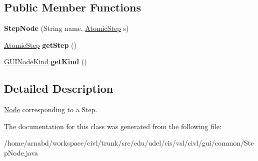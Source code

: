 \subsection*{Public Member Functions}
\begin{DoxyCompactItemize}
\item 
\hypertarget{classedu_1_1udel_1_1cis_1_1vsl_1_1civl_1_1gui_1_1common_1_1StepNode_a1a8b2ff13284c3a8cd0e5b65e8a2e622}{}{\bfseries Step\+Node} (String name, \hyperlink{interfaceedu_1_1udel_1_1cis_1_1vsl_1_1civl_1_1kripke_1_1IF_1_1AtomicStep}{Atomic\+Step} s)\label{classedu_1_1udel_1_1cis_1_1vsl_1_1civl_1_1gui_1_1common_1_1StepNode_a1a8b2ff13284c3a8cd0e5b65e8a2e622}

\item 
\hypertarget{classedu_1_1udel_1_1cis_1_1vsl_1_1civl_1_1gui_1_1common_1_1StepNode_a2953678119b2e98b4f11c32f006769e7}{}\hyperlink{interfaceedu_1_1udel_1_1cis_1_1vsl_1_1civl_1_1kripke_1_1IF_1_1AtomicStep}{Atomic\+Step} {\bfseries get\+Step} ()\label{classedu_1_1udel_1_1cis_1_1vsl_1_1civl_1_1gui_1_1common_1_1StepNode_a2953678119b2e98b4f11c32f006769e7}

\item 
\hypertarget{classedu_1_1udel_1_1cis_1_1vsl_1_1civl_1_1gui_1_1common_1_1StepNode_a07033d356d11820801a629f3ec85a26c}{}\hyperlink{enumedu_1_1udel_1_1cis_1_1vsl_1_1civl_1_1gui_1_1common_1_1GUINODE_1_1GUINodeKind}{G\+U\+I\+Node\+Kind} {\bfseries get\+Kind} ()\label{classedu_1_1udel_1_1cis_1_1vsl_1_1civl_1_1gui_1_1common_1_1StepNode_a07033d356d11820801a629f3ec85a26c}

\end{DoxyCompactItemize}


\subsection{Detailed Description}
\hyperlink{structNode}{Node} corresponding to a Step. 

The documentation for this class was generated from the following file\+:\begin{DoxyCompactItemize}
\item 
/home/arnabd/workspace/civl/trunk/src/edu/udel/cis/vsl/civl/gui/common/Step\+Node.\+java\end{DoxyCompactItemize}
